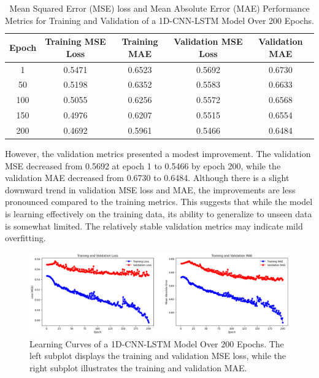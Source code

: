 \documentclass[a4paper]{article}
\begin{document}
\begin{table}[h]
\centering
\begin{tabular}{|c|c|c|c|c|} \hline
\textbf{Epoch} & \textbf{Training MSE Loss} & \textbf{Training MAE} & \textbf{Validation MSE Loss} & \textbf{Validation MAE} \\ \hline
1              & 0.5471                     & 0.6523                & 0.5692                       & 0.6730                  \\ \hline
50             & 0.5198                     & 0.6352                & 0.5583                       & 0.6633                  \\ \hline
100            & 0.5055                     & 0.6256                & 0.5572                       & 0.6568                  \\ \hline
150            & 0.4976                     & 0.6207                & 0.5515                       & 0.6554                  \\ \hline
200            & 0.4692                     & 0.5961                & 0.5466                       & 0.6484                  \\ \hline
\end{tabular}
\caption{ Mean Squared Error (MSE) loss and Mean Absolute Error (MAE) Performance Metrics for Training and Validation of a 1D-CNN-LSTM Model Over 200 Epochs.}
\label{tab:1D-CNN-LSTM-model_performance}
\end{table}


However, the validation metrics presented a modest improvement. The validation MSE decreased from 0.5692 at epoch 1 to 0.5466 by epoch 200, while the validation MAE decreased from 0.6730 to 0.6484. Although there is a slight downward trend in validation MSE loss and MAE, the improvements are less pronounced compared to the training metrics. This suggests that while the model is learning effectively on the training data, its ability to generalize to unseen data is somewhat limited. The relatively stable validation metrics may indicate mild overfitting.\\

\begin{figure}
    \centering
    \includegraphics[width=1\linewidth]{updatedLC-hybrid.png}
    \caption {Learning Curves of a 1D-CNN-LSTM Model Over 200 Epochs. The left subplot displays the training and validation MSE loss, while the right subplot illustrates the training and validation MAE.}
    \label{fig:mseless_mae1DCNN-LSTM}
\end{figure}
\end{document}
